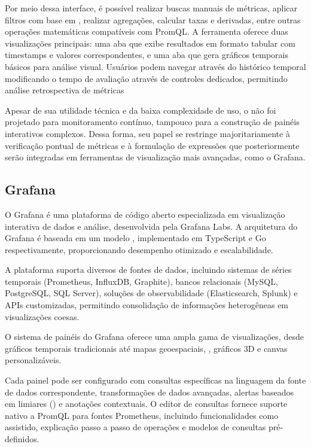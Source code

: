 Por meio dessa interface, é possível realizar buscas manuais de métricas, aplicar filtros com base em , realizar agregações, calcular taxas e derivadas, entre outras operações matemáticas compatíveis com PromQL. A ferramenta oferece duas visualizações principais: uma aba  que exibe resultados em formato tabular com timestamps e valores correspondentes, e uma aba  que gera gráficos temporais básicos para análise visual. Usuários podem navegar através do histórico temporal modificando o tempo de avaliação através de controles dedicados, permitindo análise retrospectiva de métricas

Apesar de sua utilidade técnica e da baixa complexidade de uso, o  não foi projetado para monitoramento contínuo, tampouco para a construção de painéis interativos complexos. Dessa forma, seu papel se restringe majoritariamente à verificação pontual de métricas e à formulação de expressões que posteriormente serão integradas em ferramentas de visualização mais avançadas, como o Grafana.

\subsection{Grafana}
\label{subsection:Grafana}

O Grafana \citep{grafana2025} é uma plataforma de código aberto especializada em visualização interativa de dados e análise, desenvolvida pela Grafana Labs. A arquitetura do Grafana é baseada em um modelo , implementado em TypeScript e Go respectivamente, proporcionando desempenho otimizado e escalabilidade.

A plataforma suporta diversos  de fontes de dados, incluindo sistemas de séries temporais (Prometheus, InfluxDB, Graphite), bancos relacionais (MySQL, PostgreSQL, SQL Server), soluções de observabilidade (Elasticsearch, Splunk) e APIs customizadas, permitindo consolidação de informações heterogêneas em visualizações coesas.

O sistema de painéis do Grafana oferece uma ampla gama de visualizações, desde gráficos temporais tradicionais até mapas geoespaciais, , gráficos 3D e canvas personalizáveis.

Cada painel pode ser configurado com consultas específicas na linguagem da fonte de dados correspondente, transformações de dados avançadas, alertas baseados em limiares () e anotações contextuais. O editor de consultas fornece suporte nativo a PromQL para fontes Prometheus, incluindo funcionalidades como  assistido, explicação passo a passo de operações e modelos de consultas pré-definidos.

